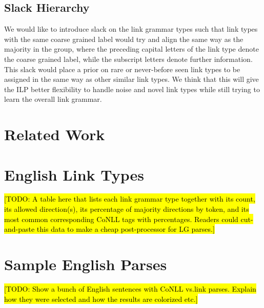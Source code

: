 \documentclass[11pt]{article}
\newcommand{\Note}[1]{}
\renewcommand{\Note}[1]{\hl{[#1]}}  %
\newcommand{\TODO}[1]{\Note{TODO: #1}}
\begin{document}
\subsection{Slack Hierarchy}
We would like to introduce slack on the link grammar types such that link types with the same coarse grained label would try and align the same way as the majority in the group, where the preceding capital letters of the link type denote the coarse grained label, while the subscript letters denote further information. This slack would place a prior on rare or never-before seen link types to be assigned in the same way as other similar link types. We think that this will give the ILP better flexibility to handle noise and novel link types while still trying to learn the overall link grammar.





\section{Related Work}










\clearpage
\appendix
\section{English Link Types}

\TODO{A table here that lists each link grammar type together with its
  count, its allowed direction(s), its percentage of majority
  directions by token, and its most common corresponding CoNLL tags
  with percentages.  Readers could cut-and-paste this data to make a 
  cheap post-processor for LG parses.}

\section{Sample English Parses}

\TODO{Show a bunch of English sentences with CoNLL vs.\@ link parses.
  Explain how they were selected and how the results are colorized etc.}
\end{document}
